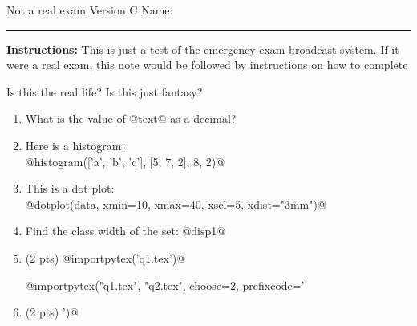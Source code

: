 \documentclass[12pt]{article}
\newcommand{\version}{C}
\begin{document}
\pagestyle{empty}

\noindent Not a real exam Version {\version} \hfill Name: \rule{6cm}{0.15mm} \vspace{2mm}

\begin{instructionbox}
    \textbf{Instructions:} This is just a test of the emergency exam broadcast system.
    If it were a real exam, this note would be followed by instructions on how to complete
\end{instructionbox}

Is this the real life?
Is this just fantasy?

\begin{enumerate}


\item What is the value of @text@ as a decimal?

\item Here is a histogram: \\[4mm]
  @histogram(['a', 'b', 'c'], [5, 7, 2], 8, 2)@


\item This is a dot plot: \\[4mm]

@dotplot(data, xmin=10, xmax=40, xscl=5, xdist="3mm")@

%
%
%

\item Find the class width of the set: @disp1@ \\[4cm]


\item (2 pts) @importpytex('q1.tex')@

@importpytex("q1.tex", "q2.tex", choose=2, prefixcode='\item (2 pts) ')@




\end{enumerate}
\end{document}
